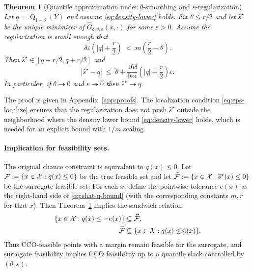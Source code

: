 \documentclass{uai2026} %
\theoremstyle{plain}
\newtheorem{theorem}{Theorem}
\theoremstyle{definition}
\newcommand{\Q}{\operatorname{Q}}
\begin{document}
\begin{theorem}[Quantile approximation under $\theta$-smoothing and $\varepsilon$-regularization]\label{thm:quantile-approx}
Let $q=\Q_{1-\delta}(Y)$ and assume \eqref{eq:density-lower} holds.
Fix $\theta\le r/2$ and let $\widehat s^\star$ be the unique minimizer of $\widehat G_{\delta,\theta,\varepsilon}(x,\cdot)$ for some $\varepsilon>0$.
Assume the regularization is small enough that
\begin{equation}
  \delta\varepsilon\left(|q|+\frac{r}{2}\right)\;<\; m\left(\frac{r}{2}-\theta\right).\label{eq:eps-localize}
\end{equation}
Then $\widehat s^\star\in[q-r/2,q+r/2]$ and
\begin{equation}
  |\widehat s^\star - q|
  \;\le\;
  \theta + \frac{16\delta}{9m}\left(|q|+\frac{r}{2}\right)\varepsilon.\label{eq:shat-q-bound}
\end{equation}
In particular, if $\theta\to 0$ and $\varepsilon\to 0$ then $\widehat s^\star\to q$.
\end{theorem}
The proof is given in Appendix~\ref{app:proofs}.
The localization condition \eqref{eq:eps-localize} ensures that the regularization does not push $\widehat s^\star$ outside the neighborhood where the density lower bound \eqref{eq:density-lower} holds, which is needed for an explicit bound with $1/m$ scaling.

\paragraph{Implication for feasibility sets.}
The original chance constraint is equivalent to $q(x)\le 0$.
Let $\mathcal{F}:=\{x\in\mathcal{X}:q(x)\le 0\}$ be the true feasible set and let $\widehat{\mathcal{F}}:=\{x\in\mathcal{X}:\widehat s^\star(x)\le 0\}$ be the surrogate feasible set.
For each $x$, define the pointwise tolerance $e(x)$ as the right-hand side of \eqref{eq:shat-q-bound} (with the corresponding constants $m,r$ for that $x$).
Then Theorem~\ref{thm:quantile-approx} implies the sandwich relation
\[
  \begin{aligned}
    \{x\in\mathcal{X}:q(x)\le -e(x)\}
    &\subseteq \widehat{\mathcal{F}},\\
    \widehat{\mathcal{F}}
    &\subseteq \{x\in\mathcal{X}:q(x)\le e(x)\}.
  \end{aligned}
\]
Thus CCO-feasible points with a margin remain feasible for the surrogate, and surrogate feasibility implies CCO feasibility up to a quantile slack controlled by $(\theta,\varepsilon)$.
\end{document}
